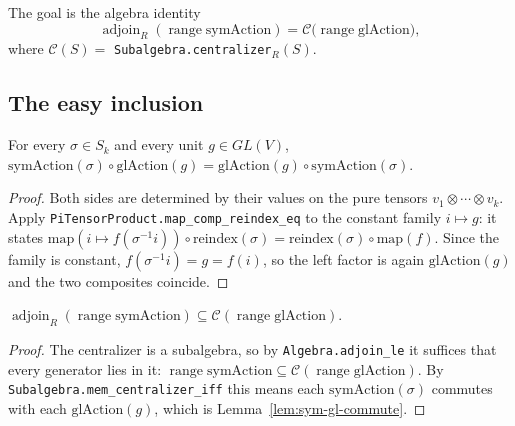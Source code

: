The goal is the algebra identity
\[
    \operatorname{adjoin}_R(\operatorname{range}\mathrm{symAction})
      = \mathcal{C}\bigl(\operatorname{range}\mathrm{glAction}\bigr),
\]
where $\mathcal{C}(S) = $ \texttt{Subalgebra.centralizer}$_R(S)$.

\subsection{The easy inclusion}

\begin{lemma}
    \label{lem:sym-gl-commute}
    \leanok
    For every $\sigma \in S_k$ and every unit $g \in GL(V)$,
    $\mathrm{symAction}(\sigma) \circ \mathrm{glAction}(g)
      = \mathrm{glAction}(g) \circ \mathrm{symAction}(\sigma)$.
\end{lemma}
\begin{proof}
    Both sides are determined by their values on the pure tensors $v_1 \otimes \cdots \otimes v_k$.
    Apply \texttt{PiTensorProduct.map\_comp\_reindex\_eq} to the constant family $i \mapsto g$: it
    states $\mathrm{map}(i \mapsto f(\sigma^{-1} i)) \circ \mathrm{reindex}(\sigma)
      = \mathrm{reindex}(\sigma) \circ \mathrm{map}(f)$. Since the family is constant,
    $f(\sigma^{-1} i) = g = f(i)$, so the left factor is again $\mathrm{glAction}(g)$ and the two
    composites coincide.
\end{proof}

\begin{lemma}
    \label{lem:adjoin-le-centralizer}
    \leanok
    $\operatorname{adjoin}_R(\operatorname{range}\mathrm{symAction})
      \subseteq \mathcal{C}(\operatorname{range}\mathrm{glAction})$.
\end{lemma}
\begin{proof}
    The centralizer is a subalgebra, so by \texttt{Algebra.adjoin\_le} it suffices that every
    generator lies in it: $\operatorname{range}\mathrm{symAction}
      \subseteq \mathcal{C}(\operatorname{range}\mathrm{glAction})$. By
    \texttt{Subalgebra.mem\_centralizer\_iff} this means each $\mathrm{symAction}(\sigma)$
    commutes with each $\mathrm{glAction}(g)$, which is Lemma~\ref{lem:sym-gl-commute}.
\end{proof}

